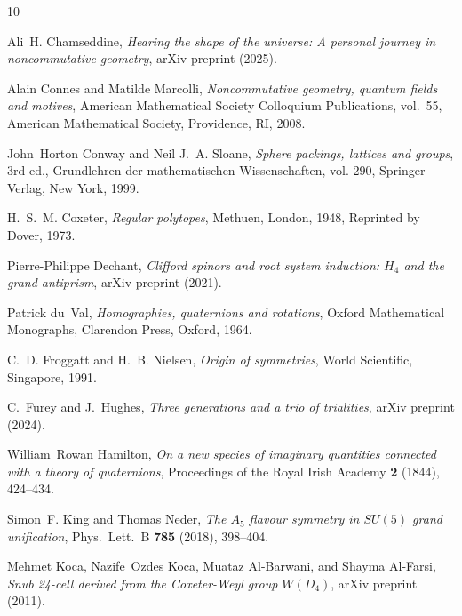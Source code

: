 \documentclass[10pt,reqno]{amsart}
\theoremstyle{plain}
\theoremstyle{definition}
\begin{document}
\providecommand{\bysame}{\leavevmode\hbox to3em{\hrulefill}\thinspace}
\providecommand{\MR}{\relax\ifhmode\unskip\space\fi MR }
\providecommand{\MRhref}[2]{%
  \href{http://www.ams.org/mathscinet-getitem?mr=#1}{#2}
}
\providecommand{\href}[2]{#2}
\begin{thebibliography}{10}

Ali~H. Chamseddine, \emph{Hearing the shape of the universe: A personal journey
  in noncommutative geometry}, arXiv preprint (2025).

Alain Connes and Matilde Marcolli, \emph{Noncommutative geometry, quantum
  fields and motives}, American Mathematical Society Colloquium Publications,
  vol.~55, American Mathematical Society, Providence, RI, 2008.

John~Horton Conway and Neil J.~A. Sloane, \emph{Sphere packings, lattices and
  groups}, 3rd ed., Grundlehren der mathematischen Wissenschaften, vol. 290,
  Springer-Verlag, New York, 1999.

H.~S.~M. Coxeter, \emph{Regular polytopes}, Methuen, London, 1948, Reprinted by
  Dover, 1973.

Pierre-Philippe Dechant, \emph{Clifford spinors and root system induction:
  {$H_4$} and the grand antiprism}, arXiv preprint (2021).

Patrick du~Val, \emph{Homographies, quaternions and rotations}, Oxford
  Mathematical Monographs, Clarendon Press, Oxford, 1964.

C.~D. Froggatt and H.~B. Nielsen, \emph{Origin of symmetries}, World
  Scientific, Singapore, 1991.

C.~Furey and J.~Hughes, \emph{Three generations and a trio of trialities},
  arXiv preprint (2024).

William~Rowan Hamilton, \emph{On a new species of imaginary quantities
  connected with a theory of quaternions}, Proceedings of the Royal Irish
  Academy \textbf{2} (1844), 424--434.

Simon~F. King and Thomas Neder, \emph{The {$A_5$} flavour symmetry in {$SU(5)$}
  grand unification}, Phys.\ Lett.\ B \textbf{785} (2018), 398--404.

Mehmet Koca, Nazife~Ozdes Koca, Muataz Al-Barwani, and Shayma Al-Farsi,
  \emph{Snub 24-cell derived from the {C}oxeter-{W}eyl group {$W(D_4)$}}, arXiv
  preprint (2011).


\end{thebibliography}
\end{document}

